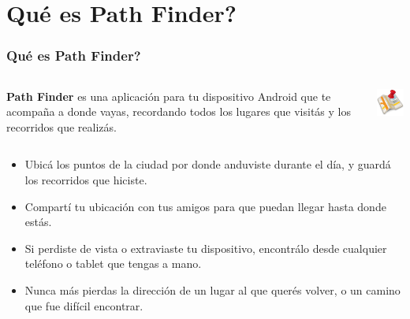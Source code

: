 \section{Qu\'e es Path Finder?}

\begin{frame}
\frametitle{Qu\'e es Path Finder?}

    \begin{columns}
        \begin{column}{.7\textwidth}
            \textbf{Path Finder} es una aplicaci\'on para tu dispositivo Android que te acompa\~na a donde vayas, recordando todos los lugares que visit\'as y los recorridos que realiz\'as.
        \end{column}
        \begin{column}{.3\textwidth}\raggedleft
            \includegraphics[width=2cm]{imagenes/maps.png}
        \end{column}
    \end{columns}

\begin{itemize}
\pause
\item Ubic\'a los puntos de la ciudad por donde anduviste durante el d\'ia, y guard\'a los recorridos que hiciste.
\pause
\item Compart\'i tu ubicaci\'on con tus amigos para que puedan llegar hasta donde est\'as.
\pause
\item Si perdiste de vista o extraviaste tu dispositivo, encontr\'alo desde cualquier tel\'efono o tablet que tengas a mano.
\pause
\item Nunca m\'as pierdas la direcci\'on de un lugar al que quer\'es volver, o un camino que fue dif\'icil encontrar.
\end{itemize}
\end{frame}
